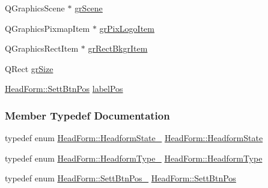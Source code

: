 \begin{DoxyCompactItemize}
\item 
Q\+Graphics\+Scene $\ast$ \mbox{\hyperlink{classHeadForm_ac4615e0489c20f6753a1804bfb9d188a}{gr\+Scene}}
\item 
Q\+Graphics\+Pixmap\+Item $\ast$ \mbox{\hyperlink{classHeadForm_a974e25ac4edb0f0a25da108c0b4da4a1}{gr\+Pix\+Logo\+Item}}
\item 
Q\+Graphics\+Rect\+Item $\ast$ \mbox{\hyperlink{classHeadForm_acc0cb81dc7cb95b72af6f44ebcc90f4e}{gr\+Rect\+Bkgr\+Item}}
\item 
Q\+Rect \mbox{\hyperlink{classHeadForm_a472b95713a709b727b84af2572f0f4f6}{gr\+Size}}
\item 
\mbox{\hyperlink{classHeadForm_ae0ae43de172739d43f503ff0a03aad1a}{Head\+Form\+::\+Sett\+Btn\+Pos}} \mbox{\hyperlink{classHeadForm_a3f9306937e89ae7a306034c875efc48e}{label\+Pos}}
\end{DoxyCompactItemize}


\subsubsection{Member Typedef Documentation}
\mbox{\label{classHeadForm_ae7f8ba0c9db5a5140ac4e3417dc1d9b2}} 
{\footnotesize\ttfamily typedef enum \mbox{\hyperlink{classHeadForm_ad43012a40fdd353f422cc70c37dd61f8}{Head\+Form\+::\+Headform\+State\+\_\+}} \mbox{\hyperlink{classHeadForm_ae7f8ba0c9db5a5140ac4e3417dc1d9b2}{Head\+Form\+::\+\texorpdfstring{Headform\+State}{HeadformState}}}}

\mbox{\label{classHeadForm_a15bfe98cd74c9677947211a02313f7d1}} 
{\footnotesize\ttfamily typedef enum \mbox{\hyperlink{classHeadForm_ae17d4f6887245f37b3f7c002dd226dd0}{Head\+Form\+::\+Headform\+Type\+\_\+}} \mbox{\hyperlink{classHeadForm_a15bfe98cd74c9677947211a02313f7d1}{Head\+Form\+::\+\texorpdfstring{Headform\+Type}{HeadformType}}}}

\mbox{\label{classHeadForm_ae0ae43de172739d43f503ff0a03aad1a}} 
{\footnotesize\ttfamily typedef enum \mbox{\hyperlink{classHeadForm_a26cd2569dd333f30e239f5ce00a267c5}{Head\+Form\+::\+Sett\+Btn\+Pos\+\_\+}} \mbox{\hyperlink{classHeadForm_ae0ae43de172739d43f503ff0a03aad1a}{Head\+Form\+::\+\texorpdfstring{Sett\+Btn\+Pos}{SettBtnPos}}}}

